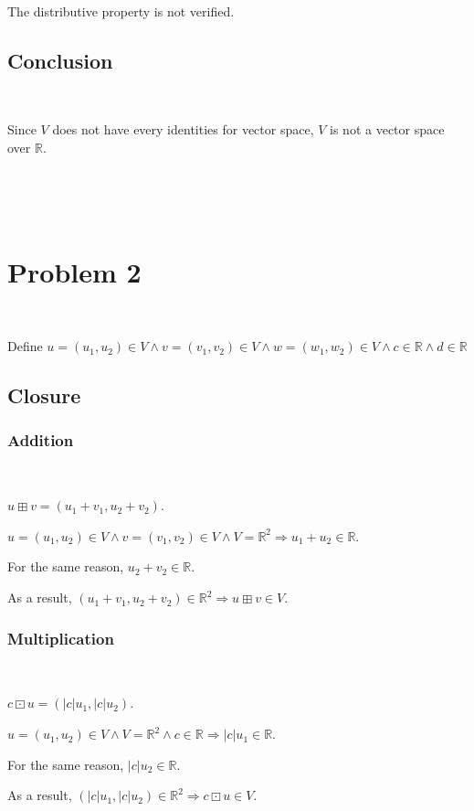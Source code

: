 \documentclass{article}
\def\R{\mathbb{R}}
\begin{document}
~

The distributive property is not verified.

\subsection{Conclusion}

~

Since $V$ does not have every identities for vector space, $V$ is not a vector space over $\R$.

~

~

\section{Problem 2}

~

Define $u=(u_1,u_2) \in V \land v=(v_1,v_2) \in V \land w=(w_1,w_2) \in V \land c \in \R \land d \in \R$

\subsection{Closure}

\subsubsection{Addition}

~

$u \boxplus v=(u_1+v_1,u_2+v_2)$.

$u=(u_1,u_2) \in V \land v=(v_1,v_2) \in V \land V= \R^2 \Rightarrow u_1+u_2 \in \R$.

For the same reason, $u_2+v_2 \in \R$.

As a result, $(u_1+v_1,u_2+v_2) \in \R^2 \Rightarrow u \boxplus v \in V$.

\subsubsection{Multiplication}

~

$c\boxdot u=(\lvert c\rvert u_1,\lvert c\rvert u_2)$.

$u=(u_1,u_2) \in V \land V = \R^2 \land c \in \R \Rightarrow \lvert c\rvert u_1 \in \R$.

For the same reason, $\lvert c \rvert u_2 \in \R$.

As a result, $(\lvert c\rvert u_1, \lvert c\rvert u_2) \in \R^2 \Rightarrow c\boxdot u \in V$.
\end{document}
